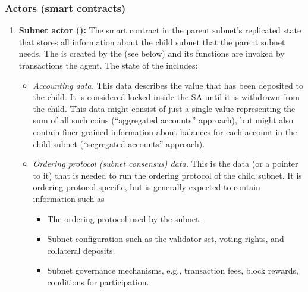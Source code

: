  \subsubsection{Actors (smart contracts)}

\begin{enumerate}
    \item \textbf{Subnet actor (\sa):} The smart contract in the parent subnet's replicated state
    that stores all information about the child subnet that the parent subnet needs.
    The \sa is created by the \gw (see below) and its functions are invoked by transactions the \ipc agent.
    The state of the \sa includes:
    \begin{itemize}

        \item \emph{Accounting data.}
        This data describes the value that has been deposited to the child.
        It is considered locked inside the SA until it is withdrawn from the child.
        This data might consist of just a single value representing the sum of all such coins (``aggregated accounts'' approach),
        but might also contain finer-grained information about balances for each account in the child subnet (``segregated accounts'' approach).


        \item \emph{Ordering protocol (subnet consensus) data.}
        This is the data (or a pointer to it) that is needed to run the ordering protocol of the child subnet.
        It is ordering protocol-specific, but is generally expected to contain information such as
        \begin{itemize}
            \item The ordering protocol used by the subnet.
            \item Subnet configuration such as the validator set, voting rights, and collateral deposits.
            \item Subnet governance mechanisms, e.g., transaction fees, block rewards, conditions for participation.
        \end{itemize}


\end{itemize}
\end{enumerate}

